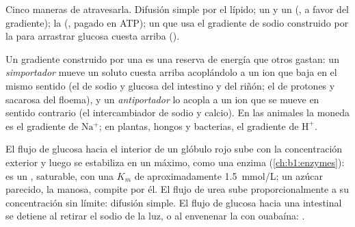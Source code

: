 \begin{omfigure}
{\small Cinco maneras de atravesarla. Difusión simple por el lípido; un
 y un  (, a favor del gradiente); la
 (, pagado en ATP); un
 que usa el gradiente de sodio construido por la  para
arrastrar glucosa cuesta arriba ().}
\end{omfigure}

\begin{proposition}\label{prop:b1:membranes-transport:secondary}
Un gradiente construido por una  es una reserva de energía que otros
 gastan: un \emph{simportador} mueve un
soluto cuesta arriba acoplándolo a un ion que baja en el mismo sentido (el
 de sodio y glucosa del intestino y del riñón; el 
de protones y sacarosa del floema), y un
\emph{antiportador} lo acopla a un ion que se mueve en
sentido contrario (el intercambiador de sodio y calcio). En las 
animales la moneda es el gradiente de $\mathrm{Na^+}$; en plantas, hongos y
bacterias, el gradiente de $\mathrm{H^+}$.
\end{proposition}

\begin{example}\label{ex:b1:membranes-transport:kinetics}
El flujo de glucosa hacia el interior de un glóbulo rojo sube con la
concentración exterior y luego se estabiliza en un máximo, como una enzima
(\cref{ch:b1:enzymes}): es un , saturable, con una $K_m$ de
aproximadamente \qty{1.5}{mmol/L}; un azúcar parecido, la manosa, compite
por él. El flujo de urea sube proporcionalmente a su concentración sin
límite: difusión simple. El flujo de glucosa hacia una  intestinal se
detiene al retirar el sodio de la luz, o al envenenar la  con
ouabaína: .
\end{example}

